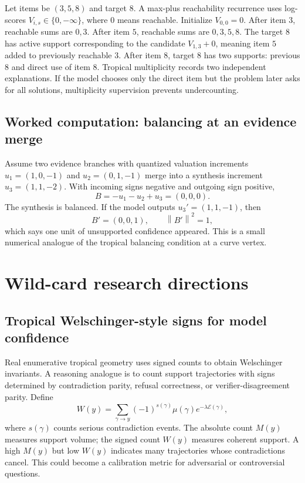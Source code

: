 \documentclass[11pt]{article}
\newcommand{\calE}{\mathcal{E}}
\newcommand{\norm}[1]{\left\lVert #1\right\rVert}
\begin{document}
Let items be \((3,5,8)\) and target \(8\).  A max-plus reachability recurrence uses log-scores \(V_{i,s}\in\{0,-\infty\}\), where \(0\) means reachable.  Initialize \(V_{0,0}=0\).  After item \(3\), reachable sums are \(0,3\).  After item \(5\), reachable sums are \(0,3,5,8\).  The target \(8\) has active support corresponding to the candidate \(V_{1,3}+0\), meaning item \(5\) added to previously reachable \(3\).  After item \(8\), target \(8\) has two supports: previous \(8\) and direct use of item \(8\).  Tropical multiplicity records two independent explanations.  If the model chooses only the direct item but the problem later asks for all solutions, multiplicity supervision prevents undercounting.

\subsection{Worked computation: balancing at an evidence merge}

Assume two evidence branches with quantized valuation increments \(u_1=(1,0,-1)\) and \(u_2=(0,1,-1)\) merge into a synthesis increment \(u_3=(1,1,-2)\).  With incoming signs negative and outgoing sign positive,
\begin{equation}
B=-u_1-u_2+u_3=(0,0,0).
\end{equation}
The synthesis is balanced.  If the model outputs \(u_3'=(1,1,-1)\), then
\begin{equation}
B'=(0,0,1),\qquad \norm{B'}^2=1,
\end{equation}
which says one unit of unsupported confidence appeared.  This is a small numerical analogue of the tropical balancing condition at a curve vertex.

\section{Wild-card research directions}

\subsection{Tropical Welschinger-style signs for model confidence}

Real enumerative tropical geometry uses signed counts to obtain Welschinger invariants.  A reasoning analogue is to count support trajectories with signs determined by contradiction parity, refusal correctness, or verifier-disagreement parity.  Define
\begin{equation}
W(y)=\sum_{\gamma\to y}(-1)^{s(\gamma)}\mu(\gamma)e^{-\lambda\calE(\gamma)},
\end{equation}
where \(s(\gamma)\) counts serious contradiction events.  The absolute count \(M(y)\) measures support volume; the signed count \(W(y)\) measures coherent support.  A high \(M(y)\) but low \(W(y)\) indicates many trajectories whose contradictions cancel.  This could become a calibration metric for adversarial or controversial questions.
\end{document}
